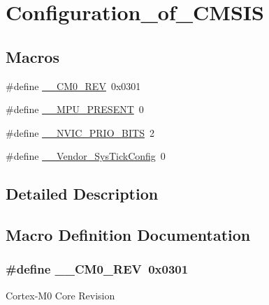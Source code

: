 \hypertarget{group___configuration__of___c_m_s_i_s}{}\section{Configuration\+\_\+of\+\_\+\+C\+M\+S\+I\+S}
\label{group___configuration__of___c_m_s_i_s}
\subsection*{Macros}
\begin{DoxyCompactItemize}
\item 
\#define \hyperlink{group___configuration__of___c_m_s_i_s_ga905517438930a3f13cbc632e52990534}{\+\_\+\+\_\+\+C\+M0\+\_\+\+R\+E\+V}~0x0301
\item 
\#define \hyperlink{group___configuration__of___c_m_s_i_s_ga4127d1b31aaf336fab3d7329d117f448}{\+\_\+\+\_\+\+M\+P\+U\+\_\+\+P\+R\+E\+S\+E\+N\+T}~0
\item 
\#define \hyperlink{group___configuration__of___c_m_s_i_s_gae3fe3587d5100c787e02102ce3944460}{\+\_\+\+\_\+\+N\+V\+I\+C\+\_\+\+P\+R\+I\+O\+\_\+\+B\+I\+T\+S}~2
\item 
\#define \hyperlink{group___configuration__of___c_m_s_i_s_gab58771b4ec03f9bdddc84770f7c95c68}{\+\_\+\+\_\+\+Vendor\+\_\+\+Sys\+Tick\+Config}~0
\end{DoxyCompactItemize}


\subsection{Detailed Description}


\subsection{Macro Definition Documentation}
\hypertarget{group___configuration__of___c_m_s_i_s_ga905517438930a3f13cbc632e52990534}{}
\subsubsection[{\+\_\+\+\_\+\+C\+M0\+\_\+\+R\+E\+V}]{\setlength{\rightskip}{0pt plus 5cm}\#define \+\_\+\+\_\+\+C\+M0\+\_\+\+R\+E\+V~0x0301}\label{group___configuration__of___c_m_s_i_s_ga905517438930a3f13cbc632e52990534}
Cortex-\/\+M0 Core Revision \hypertarget{group___configuration__of___c_m_s_i_s_ga4127d1b31aaf336fab3d7329d117f448}{}
